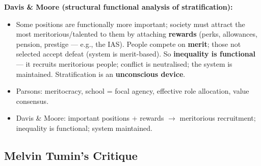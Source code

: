 \begin{DataFact}
\textbf{Davis \& Moore (structural functional analysis of stratification):}
\begin{itemize}
\item Some positions are functionally more important; society must attract the most meritorious/talented to them by attaching \textbf{rewards} (perks, allowances, pension, prestige --- e.g., the IAS). People compete on \textbf{merit}; those not selected accept defeat (system is merit-based). So \textbf{inequality is functional} --- it recruits meritorious people; conflict is neutralised; the system is maintained. Stratification is an \textbf{unconscious device}.
\end{itemize}
\end{DataFact}

\begin{QuickRevision}
\begin{itemize}
\item Parsons: meritocracy, school = focal agency, effective role allocation, value consensus.
\item Davis \& Moore: important positions + rewards $\rightarrow$ meritorious recruitment; inequality is functional; system maintained.
\end{itemize}
\end{QuickRevision}

\sectiondivider

\subsection{Melvin Tumin's Critique}

